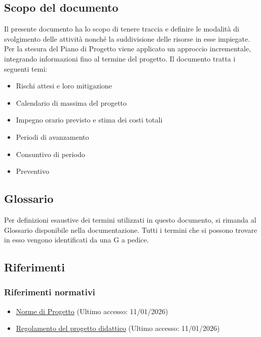 \documentclass[a4paper,12pt]{article}
\begin{document}
    \subsection{Scopo del documento}
        Il presente documento ha lo scopo di tenere traccia e definire le modalità di svolgimento delle attività nonché la suddivisione delle risorse in esse impiegate.
        Per la stesura del Piano di Progetto viene applicato un approccio incrementale, integrando informazioni fino al termine del progetto. Il documento tratta i seguenti temi:
        \begin{itemize}
            \item Rischi attesi e loro mitigazione
            \item Calendario di massima del progetto
            \item Impegno orario previsto e stima dei costi totali
            \item Periodi di avanzamento
            \item Consuntivo di periodo
            \item Preventivo
        \end{itemize}
    \subsection{Glossario}
        Per definizioni esaustive dei termini utilizzati in questo documento, si rimanda al Glossario disponibile nella documentazione. Tutti i termini che si possono trovare in esso vengono identificati da una G a pedice.
    \subsection{Riferimenti}
        \subsubsection{Riferimenti normativi}
            \begin{itemize}
                \item \href{https://team-three-technologies.github.io/Documenti/1%20-%20RTB/Norme_di_progetto_v0_4.pdf}{Norme di Progetto} (Ultimo accesso: 11/01/2026)
                \item \href{https://www.math.unipd.it/~tullio/IS-1/2025/Dispense/PD1.pdf}{Regolamento del progetto didattico} (Ultimo accesso: 11/01/2026)
            \end{itemize}
\end{document}

